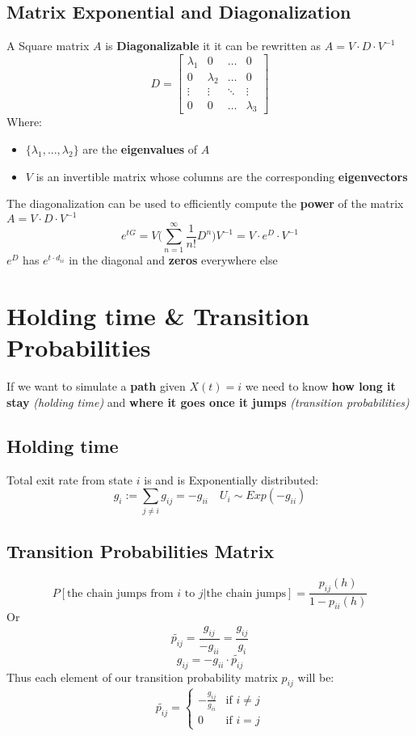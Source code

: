 \subsection{Matrix Exponential and Diagonalization}
A Square matrix $A$ is \textbf{Diagonalizable} it it can be rewritten as $A = V \cdot D \cdot V^{-1}$
$$
D = \begin{bmatrix}
\lambda_1 & 0 & \hdots & 0\\
0 & \lambda_2 & \hdots & 0\\
\vdots & \vdots & \ddots & \vdots\\
0 & 0 & \hdots  &\lambda_3 
\end{bmatrix}
$$
Where:
\begin{itemize}
    \item $\{\lambda_1, ...,\lambda_2\}$ are the \textbf{eigenvalues} of $A$
    \item $V$ is an invertible matrix whose columns are the corresponding \textbf{eigenvectors}
\end{itemize}
The diagonalization can be used to efficiently compute the \textbf{power} of the matrix $A = V \cdot D \cdot V^{-1}$
$$e^{tG} = V\Bigg(\sum_{n = 1}^\infty \frac{1}{n!}D^n\Bigg)V^{-1} = V \cdot e^D \cdot V^{-1}$$
$e^D$ has $e^{t \cdot d_{ii}}$ in the diagonal and \textbf{zeros} everywhere else


\section{Holding time \& Transition Probabilities}
\begin{tcolorbox}
If we want to simulate a \textbf{path} given $X(t) = i$ we need to know \textbf{how long it stay} \textit{(holding time)} and \textbf{where it goes once it jumps} \textit{(transition probabilities)}
\end{tcolorbox}

\subsection{Holding time}
\begin{tcolorbox}
Total exit rate from state $i$ is and is Exponentially distributed:
$$g_i := \sum_{j \neq i} g_{ij} = -g_{ii} \quad U_i \sim Exp(-g_{ii})$$    
\end{tcolorbox}

\subsection{Transition Probabilities Matrix}
\begin{tcolorbox}
$$P[\text{the chain jumps from }i \text{ to }j | \text{the chain jumps}] = \frac{p_{ij}(h)}{1- p_{ii}(h)}$$
Or
$$\tilde{p_{ij}} = \frac{g_{ij}}{-g_{ii}} = \frac{g_{ij}}{g_i}$$  
$$g_{ij} = -g_{ii} \cdot \tilde{p_{ij}}$$
Thus each element of our transition probability matrix $p_{ij}$ will be:
$$
\tilde{p_{ij}}=
\begin{cases} 
-\frac{g_{ij}}{g_{ii}} & \mbox{if } i \neq j \\
0 & \mbox{if } i=j
\end{cases}
$$
\end{tcolorbox}

